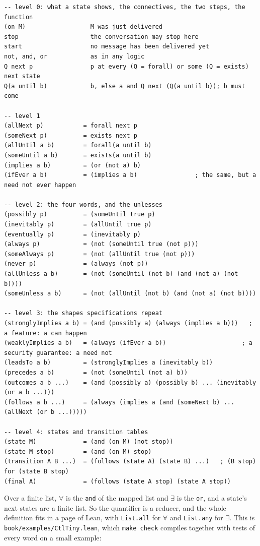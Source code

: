 \begin{lstlisting}[language={},basicstyle=\ttfamily\footnotesize]
-- level 0: what a state shows, the connectives, the two steps, the function
(on M)                  M was just delivered
stop                    the conversation may stop here
start                   no message has been delivered yet
not, and, or            as in any logic
Q next p                p at every (Q = forall) or some (Q = exists) next state
Q(a until b)            b, else a and Q next (Q(a until b)); b must come

-- level 1
(allNext p)           = forall next p
(someNext p)          = exists next p
(allUntil a b)        = forall(a until b)
(someUntil a b)       = exists(a until b)
(implies a b)         = (or (not a) b)
(ifEver a b)          = (implies a b)                ; the same, but a need not ever happen

-- level 2: the four words, and the unlesses
(possibly p)          = (someUntil true p)
(inevitably p)        = (allUntil true p)
(eventually p)        = (inevitably p)
(always p)            = (not (someUntil true (not p)))
(someAlways p)        = (not (allUntil true (not p)))
(never p)             = (always (not p))
(allUnless a b)       = (not (someUntil (not b) (and (not a) (not b))))
(someUnless a b)      = (not (allUntil (not b) (and (not a) (not b))))

-- level 3: the shapes specifications repeat
(stronglyImplies a b) = (and (possibly a) (always (implies a b)))   ; a feature: a can happen
(weaklyImplies a b)   = (always (ifEver a b))                     ; a security guarantee: a need not
(leadsTo a b)         = (stronglyImplies a (inevitably b))
(precedes a b)        = (not (someUntil (not a) b))
(outcomes a b ...)    = (and (possibly a) (possibly b) ... (inevitably (or a b ...)))
(follows a b ...)     = (always (implies a (and (someNext b) ... (allNext (or b ...)))))

-- level 4: states and transition tables
(state M)             = (and (on M) (not stop))
(state M stop)        = (and (on M) stop)
(transition A B ...)  = (follows (state A) (state B) ...)   ; (B stop) for (state B stop)
(final A)             = (follows (state A stop) (state A stop))
\end{lstlisting}

Over a finite list, $\forall$ is the \texttt{and} of the mapped list and $\exists$ is the
\texttt{or}, and a state's next states are a finite list. So the quantifier is a reducer, and the
whole definition fits in a page of Lean, with \texttt{List.all} for $\forall$ and
\texttt{List.any} for $\exists$. This is \texttt{book/examples/CtlTiny.lean}, which
\texttt{make check} compiles together with tests of every word on a small example:

